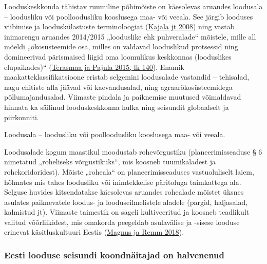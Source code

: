 \documentclass[estonian,]{article}
\begin{document}
Looduskeskkonda tähistav ruumiline põhimõiste on käesolevas aruandes loodusala -- loodusliku või poolloodusliku kooslusega maa- või veeala. See järgib looduses viibimise ja looduskülastuste terminoloogiat (\protect\hyperlink{Kajala2008}{Kajala jt 2008}) ning vastab inimarengu aruandes 2014/2015 „looduslike ehk puhveralade`` mõistele, mille all mõeldi „ökosüsteemide osa, milles on valdavad looduslikud protsessid ning domineerivad pärismaised liigid oma loomulikus keskkonnas (looduslikes elupaikades)`` (\protect\hyperlink{Terasmaa2015}{Terasmaa ja Pajula 2015, lk 140}). Enamik maakatteklassifikatsioone eristab selgemini loodusalade vastandid -- tehisalad, nagu ehitiste alla jäävad või kaevandusalad, ning agraarökosüsteemidega põllumajandusalad. Viimaste pindala ja paiknemise muutused võimaldavad hinnata ka säilinud looduskeskkonna hulka ning seisundit globaalselt ja piirkonniti.

\begin{blockquote-left}
Loodusala -- loodusliku või poolloodusliku kooslusega maa- või veeala.
\end{blockquote-left}

Loodusalade kogum maastikul moodustab rohevõrgustiku (planeerimisseaduse § 6 nimetatud „roheliseks võrgustikuks``, mis koosneb tuumikaladest ja rohekoridoridest). Mõiste „roheala`` on planeerimisseaduses vastuoluliselt laiem, hõlmates mis tahes loodusliku või inimtekkelise päritoluga taimkattega ala. Selguse huvides kitsendatakse käesolevas aruandes rohealade mõistet üksnes asulates paiknevatele loodus- ja looduseilmelistele aladele (pargid, haljasalad, kalmistud jt). Viimaste taimestik on sageli kultiveeritud ja koosneb teadlikult valitud võõrliikidest, mis omakorda peegeldab asulavälise ja -sisese looduse erinevat käsitluskultuuri Eestis (\protect\hyperlink{Magnus2018}{Magnus ja Remm 2018}).

\hypertarget{eesti-looduse-seisundi-koondnuxe4itajad-on-halvenenud}{%
\subsubsection*{Eesti looduse seisundi koondnäitajad on halvenenud}\label{eesti-looduse-seisundi-koondnuxe4itajad-on-halvenenud}}
\end{document}
